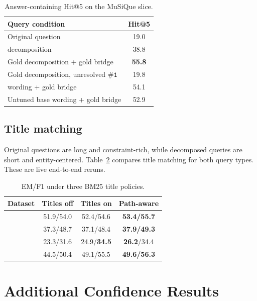 \begin{table}[h]
\caption{Answer-containing Hit@5 on the MuSiQue slice.}
\label{tab:gold-decomp}
\centering
\small
\setlength{\tabcolsep}{7pt}
\begin{tabular}{lc}
\toprule
Query condition & Hit@5 \\
\midrule
Original question & 19.0 \\
\method{} decomposition & 38.8 \\
Gold decomposition + gold bridge & \textbf{55.8} \\
Gold decomposition, unresolved \(\texttt{\#1}\) & 19.8 \\
\method{} wording + gold bridge & 54.1 \\
Untuned base wording + gold bridge & 52.9 \\
\bottomrule
\end{tabular}
\end{table}

\subsection{Title matching}

Original questions are long and constraint-rich, while decomposed queries are
short and entity-centered. Table~\ref{tab:title-policy} compares title matching
for both query types. These are live end-to-end reruns.

\begin{table}[h]
\caption{EM/F1 under three BM25 title policies.}
\label{tab:title-policy}
\centering
\small
\setlength{\tabcolsep}{7pt}
\begin{tabular}{lccc}
\toprule
Dataset & Titles off & Titles on & Path-aware \\
\midrule
\popqa{} & 51.9/54.0 & 52.4/54.6 & \textbf{53.4/55.7} \\
\hotpot{} & 37.3/48.7 & 37.1/48.4 & \textbf{37.9/49.3} \\
\musique{} & 23.3/31.6 & 24.9/\textbf{34.5} & \textbf{26.2}/34.4 \\
\twowiki{} & 44.5/50.4 & 49.1/55.5 & \textbf{49.6/56.3} \\
\bottomrule
\end{tabular}
\end{table}

\section{Additional Confidence Results}
\label{app:confidence}

